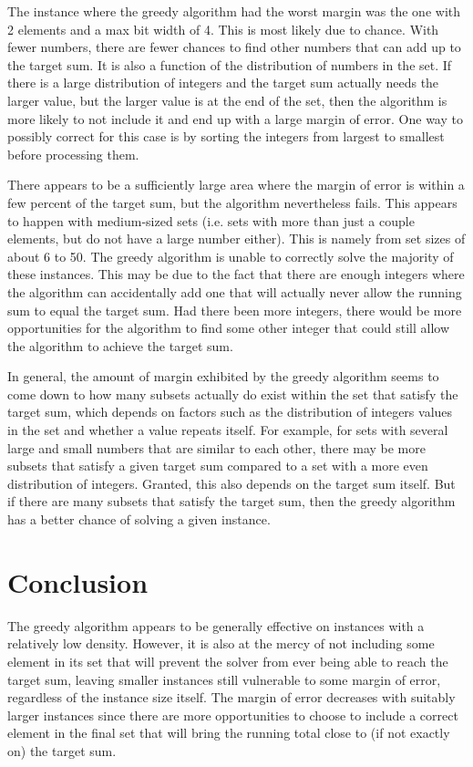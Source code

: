 \documentclass{report}
\begin{document}
The instance where the greedy algorithm had the worst margin was the one with 2 elements and a
max bit width of 4. This is most likely
due to chance. With fewer numbers, there are fewer chances to find other numbers that can add up
to the target sum. It is also a function of the distribution of numbers in the set. If there is a large
distribution of integers and the target sum actually needs the larger value, but the larger value is
at the end of the set, then the algorithm is more likely to not include it and end up with a large
margin of error. One way to possibly correct for this case is by sorting the integers from largest to
smallest before processing them.

There appears to be a sufficiently large area where the margin of error is within a few percent of the target sum,
but the algorithm nevertheless fails. This appears to happen with medium-sized sets (i.e. sets
with more than just a couple elements, but do not have a large number either). This is namely from set sizes
of about 6 to 50. The greedy algorithm is unable to correctly solve the majority of these instances.
This may be due to the fact that there are enough integers where the algorithm can accidentally add one
that will actually never allow the running sum to equal the target sum. Had there been more integers, there
would be more opportunities for the algorithm to find some other integer that could still allow
the algorithm to achieve the target sum.

In general, the amount of margin exhibited by the greedy algorithm seems to come down to how many
subsets actually do exist within the set that
satisfy the target sum, which depends on factors such as the distribution of integers values in the set
and whether a value repeats itself.
For example, for sets with several large and small numbers that are similar to each other, there may
be more subsets that satisfy a given target sum compared to a set with a more even distribution of integers.
Granted, this also depends on the target sum itself. But if there are many subsets that satisfy the
target sum, then the greedy algorithm has a better chance of solving a given instance.

\section{Conclusion}
The greedy algorithm appears to be generally effective on instances with a relatively low density. However,
it is also at the mercy of not including some element in its set that will prevent the solver from ever
being able to reach the target sum, leaving smaller instances still vulnerable to some margin of error,
regardless of the instance size itself. The margin of error decreases with suitably larger instances
since there are more opportunities to choose to include a correct element in the final set that
will bring the running total close to (if not exactly on) the target sum.
\end{document}

